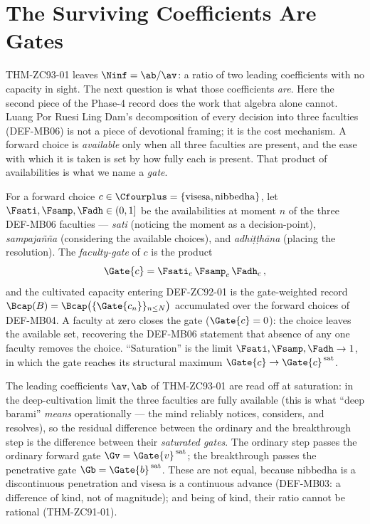 \documentclass[12pt, a4paper]{article}
\begin{document}
\section{The Surviving Coefficients Are Gates}
\label{sec:gates-zc93}

THM-ZC93-01 leaves $\Ninf=\ab/\av$: a ratio of two leading coefficients with
no capacity in sight. The next question is what those coefficients \emph{are}.
Here the second piece of the Phase-4 record does the work that algebra alone
cannot. Luang Por Ruesi Ling Dam's decomposition of every decision into three
faculties (DEF-MB06) is not a piece of devotional framing; it is the cost
mechanism. A forward choice is \emph{available} only when all three faculties
are present, and the ease with which it is taken is set by how fully each is
present. That product of availabilities is what we name a \emph{gate}.

\begin{formalbox}[title={DEF-ZC93-01: The Faculty-Gate}]
For a forward choice $c\in\Cfourplus=\{\text{visesa},\text{nibbedha}\}$, let
$\Fsati,\Fsamp,\Fadh\in(0,1]$ be the availabilities at moment $n$ of the three
DEF-MB06 faculties --- \emph{sati} (noticing the moment as a decision-point),
\emph{sampaja\~n\~na} (considering the available choices), and
\emph{adhi\d{t}\d{t}h\=ana} (placing the resolution). The \emph{faculty-gate}
of $c$ is the product
\[
  \Gate{c}=\Fsati_{c}\,\Fsamp_{c}\,\Fadh_{c}\,,
\]
and the cultivated capacity entering DEF-ZC92-01 is the gate-weighted record
$\Bcap(B)=\Bcap\big(\{\Gate{c_n}\}_{n\le N}\big)$ accumulated over the
forward choices of DEF-MB04. A faculty at zero closes the gate
($\Gate{c}=0$): the choice leaves the available set, recovering the DEF-MB06
statement that absence of any one faculty removes the choice. ``Saturation''
is the limit $\Fsati,\Fsamp,\Fadh\to1$, in which the gate reaches its
structural maximum $\Gate{c}\to\Gate{c}^{\,\mathrm{sat}}$.
\end{formalbox}

The leading coefficients $\av,\ab$ of THM-ZC93-01 are read off at saturation:
in the deep-cultivation limit the three faculties are fully available (this is
what ``deep barami'' \emph{means} operationally --- the mind reliably notices,
considers, and resolves), so the residual difference between the ordinary and
the breakthrough step is the difference between their \emph{saturated gates}.
The ordinary step passes the ordinary forward gate $\Gv=\Gate{v}^{\,
\mathrm{sat}}$; the breakthrough passes the penetrative gate $\Gb=\Gate{b}^{\,
\mathrm{sat}}$. These are not equal, because nibbedha is a discontinuous
penetration and visesa is a continuous advance (DEF-MB03: a difference of kind,
not of magnitude); and being of kind, their ratio cannot be rational
(THM-ZC91-01).
\end{document}
